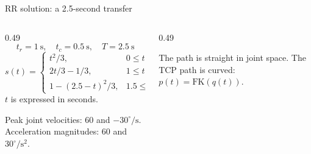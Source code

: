 \documentclass[aspectratio=169]{beamer}
\begin{document}
\begin{frame}[t]{RR solution: a 2.5-second transfer}
    \small
    \begin{columns}[T,onlytextwidth]
        \begin{column}{0.49\textwidth}
            \[t_r=1\ \mathrm{s},\quad t_c=0.5\ \mathrm{s},\quad T=2.5\ \mathrm{s}\]
            \[s(t)=\begin{cases}
                t^2/3,&0\leq t\leq1,\\
                2t/3-1/3,&1\leq t\leq1.5,\\
                1-(2.5-t)^2/3,&1.5\leq t\leq2.5.
            \end{cases}\]
            $t$ is expressed in seconds.
            \medskip

            Peak joint velocities: $60$ and $-30^\circ/\mathrm{s}$. Acceleration magnitudes: $60$ and $30^\circ/\mathrm{s}^2$.
        \end{column}
        \begin{column}{0.49\textwidth}
            \centering
            \par\raggedright The path is straight in joint space. The TCP path is curved: $p(t)=\mathrm{FK}(q(t))$.
        \end{column}
    \end{columns}
\end{frame}
\end{document}
